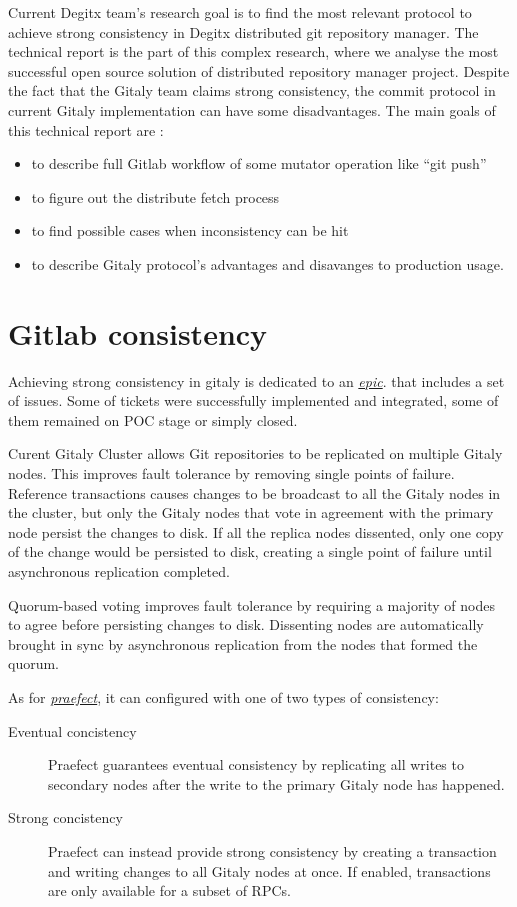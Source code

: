 \documentclass[acmlarge, screen, nonacm]{acmart}
\begin{document}
Current Degitx team's research goal is to find the most relevant protocol to achieve 
strong consistency in Degitx distributed git repository manager. The technical report is the part of this complex research, 
where we analyse the most successful open source solution of distributed repository manager project.
Despite the fact that the Gitaly team claims strong consistency, the commit protocol in current Gitaly 
implementation can have some disadvantages. The main goals of this technical report are : 
\begin{itemize}
\item to describe full Gitlab workflow of some mutator operation like ``git push'' 
\item to figure out the distribute fetch process 
\item to find possible cases when inconsistency can be hit 
\item to describe Gitaly protocol's advantages and disavanges to production usage. 
\end{itemize}
 
\section{Gitlab consistency}
  Achieving strong consistency in gitaly is dedicated to an
  \emph{\href{https://gitlab.com/groups/gitlab-org/-/epics/1189}{epic}}. 
  that includes a set of issues. Some of tickets were successfully implemented and integrated,
  some of them remained on POC stage or simply closed.
  
  Curent Gitaly Cluster allows Git repositories to be replicated on multiple Gitaly nodes. 
  This improves fault tolerance by removing single points of failure. 
  Reference transactions causes changes to be broadcast to all the Gitaly nodes in the cluster, 
  but only the Gitaly nodes that vote in agreement with the primary node persist the changes to disk. 
  If all the replica nodes dissented, only one copy of the change would be persisted to disk, 
  creating a single point of failure until asynchronous replication completed.

  Quorum-based voting improves fault tolerance by requiring a majority of nodes 
  to agree before persisting changes to disk. Dissenting nodes are automatically brought in sync by
   asynchronous replication from the nodes that formed the quorum.

  As for \emph{\href{https://gitlab.com/groups/gitlab-org/-/epics/1189}{praefect}}, it can configured 
  with one of two types of consistency:
  \begin{description}
    \item[Eventual concistency]
    Praefect guarantees eventual consistency by replicating all writes 
    to secondary nodes after the write to the primary Gitaly node has happened.
    \item[Strong concistency]
    Praefect can instead provide strong consistency by creating a transaction and writing
     changes to all Gitaly nodes at once. If enabled, transactions are only available for a subset of RPCs. 
  \end{description}
  
\end{document}

